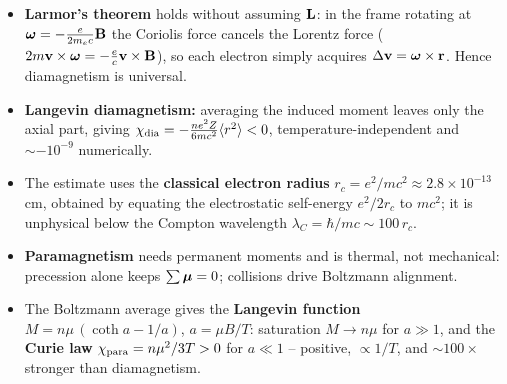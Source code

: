 \begin{itemize}
  \item \textbf{Larmor's theorem} holds without assuming $\mathbf{L}$: in the frame rotating
        at $\boldsymbol{\omega}=-\tfrac{e}{2m_ec}\mathbf{B}$ the Coriolis force cancels the Lorentz
        force ($2m\mathbf{v}\times\boldsymbol{\omega}=-\tfrac{e}{c}\mathbf{v}\times\mathbf{B}$), so each
        electron simply acquires $\Delta\mathbf{v}=\boldsymbol{\omega}\times\mathbf{r}$. Hence
        diamagnetism is universal.
  \item \textbf{Langevin diamagnetism:} averaging the induced moment leaves only the axial
        part, giving $\chi_{\rm dia}=-\tfrac{ne^2Z}{6mc^2}\langle r^2\rangle<0$,
        temperature-independent and $\sim-10^{-9}$ numerically.
  \item The estimate uses the \textbf{classical electron radius}
        $r_c=e^2/mc^2\approx2.8\times10^{-13}\,$cm, obtained by equating the electrostatic
        self-energy $e^2/2r_c$ to $mc^2$; it is unphysical below the Compton wavelength
        $\lambda_C=\hbar/mc\sim100\,r_c$.
  \item \textbf{Paramagnetism} needs permanent moments and is thermal, not mechanical:
        precession alone keeps $\sum\boldsymbol{\mu}=0$; collisions drive Boltzmann alignment.
  \item The Boltzmann average gives the \textbf{Langevin function}
        $M=n\mu\,(\coth a-1/a)$, $a=\mu B/T$: saturation $M\to n\mu$ for $a\gg1$, and the
        \textbf{Curie law} $\chi_{\rm para}=n\mu^2/3T>0$ for $a\ll1$ -- positive, $\propto
        1/T$, and $\sim100\times$ stronger than diamagnetism.
\end{itemize}
